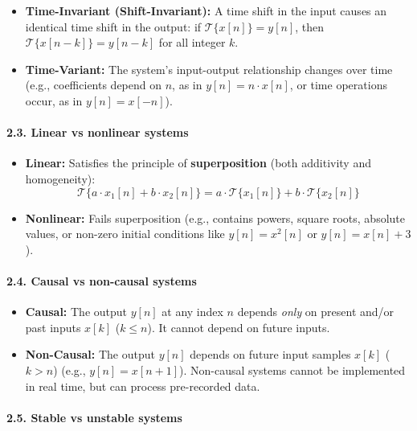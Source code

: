 \begin{itemize}
\tightlist
\item
  \textbf{Time-Invariant (Shift-Invariant):} A time shift in the input
  causes an identical time shift in the output: if
  \(\mathcal{T}\{x[n]\} = y[n]\), then
  \(\mathcal{T}\{x[n-k]\} = y[n-k]\) for all integer \(k\).
\item
  \textbf{Time-Variant:} The system's input-output relationship changes
  over time (e.g., coefficients depend on \(n\), as in
  \(y[n] = n \cdot x[n]\), or time operations occur, as in
  \(y[n] = x[-n]\)).
\end{itemize}

\paragraph{2.3. Linear vs nonlinear
systems}\label{linear-vs-nonlinear-systems}

\begin{itemize}
\tightlist
\item
  \textbf{Linear:} Satisfies the principle of \textbf{superposition}
  (both additivity and homogeneity):
  \[\mathcal{T}\{a \cdot x_1[n] + b \cdot x_2[n]\} = a \cdot \mathcal{T}\{x_1[n]\} + b \cdot \mathcal{T}\{x_2[n]\}\]
\item
  \textbf{Nonlinear:} Fails superposition (e.g., contains powers, square
  roots, absolute values, or non-zero initial conditions like
  \(y[n] = x^2[n]\) or \(y[n] = x[n] + 3\)).
\end{itemize}

\paragraph{2.4. Causal vs non-causal
systems}\label{causal-vs-non-causal-systems}

\begin{itemize}
\tightlist
\item
  \textbf{Causal:} The output \(y[n]\) at any index \(n\) depends
  \emph{only} on present and/or past inputs \(x[k]\) (\(k \le n\)). It
  cannot depend on future inputs.
\item
  \textbf{Non-Causal:} The output \(y[n]\) depends on future input
  samples \(x[k]\) (\(k > n\)) (e.g., \(y[n] = x[n+1]\)). Non-causal
  systems cannot be implemented in real time, but can process
  pre-recorded data.
\end{itemize}

\paragraph{2.5. Stable vs unstable
systems}\label{stable-vs-unstable-systems}


